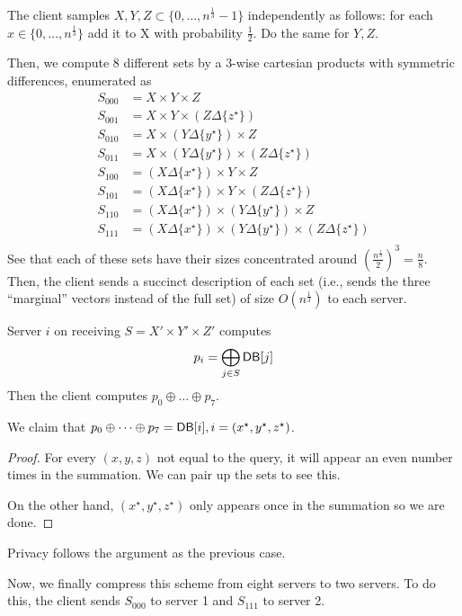 \begin{enumerate}
		The client samples $X,Y,Z \subset \{0, \dots, n^{\frac{1}{3}} - 1\}$ independently as follows: for each $x \in \{0,\dots, n^{\frac{1}{3}}\}$ add it to X with probability $\frac 1 2$. Do the same for $Y,Z$.
	
		Then, we compute $8$ different sets by a 3-wise cartesian products with symmetric differences, enumerated as 
		\begin{align*}
			S_{000} &= X \times Y \times Z \\
			S_{001} &= X \times Y \times (Z \Delta \{z^\star\}) \\
			S_{010} &= X \times (Y \Delta \{y^{\star}\}) \times Z \\
			S_{011} &= X \times (Y \Delta \{y^{\star}\}) \times (Z \Delta \{z^\star\}) \\
			S_{100} &= (X \Delta \{x^{\star}\}) \times Y \times Z \\
			S_{101} &= (X \Delta \{x^{\star}\}) \times Y \times (Z \Delta \{z^\star\}) \\
			S_{110} &= (X \Delta \{x^{\star}\}) \times (Y \Delta \{y^{\star}\}) \times Z \\
			S_{111} &= (X \Delta \{x^{\star}\}) \times (Y \Delta \{y^{\star}\}) \times (Z \Delta \{z^\star\}) \\
		\end{align*}
		See that each of these sets have their sizes concentrated around $\left(\frac{n^{\frac 1 3}}{2}\right)^{3} = \frac n 8$. Then, the client sends a succinct description of each set (i.e., sends the three ``marginal'' vectors instead of the full set) of size $O(n^{\frac 1 3})$ to each server. 

		Server $i$ on receiving $S = X' \times Y' \times Z'$ computes 
			\[p_{i} = \bigoplus_{j \in S} {\sf DB}[j]\]
		Then the client computes $p_0 \oplus \dots \oplus p_7$. 

		We claim that $p_0 \oplus \dots \oplus p_7 = {\sf DB}[i], i = (x^\star, y^\star, z^\star)$.
		\begin{proof}
		For every $(x,y,z)$ not equal to the query, it will appear an even number times in the summation. We can pair up the sets to see this. 

		On the other hand, $(x^\star, y^\star, z^\star)$ only appears once in the summation so we are done.
		\end{proof}

		Privacy follows the argument as the previous case. 
\end{enumerate}

Now, we finally compress this scheme from eight servers to two servers. To do this, the client sends $S_{000}$ to server 1 and $S_{111}$ to server 2.

